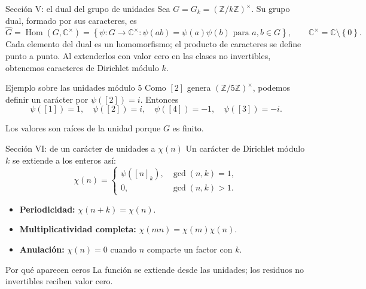 \documentclass[aspectratio=169,11pt]{beamer}
\newcommand{\ZZ}{\mathbb{Z}}
\newcommand{\CC}{\mathbb{C}}
\newcommand{\units}[1]{(\mathbb{Z}/#1\mathbb{Z})^{\times}}
\newcommand{\Set}[1]{\left\{#1\right\}}
\begin{document}
\begin{frame}{Sección V: el dual del grupo de unidades}
    Sea $G=G_k=(\ZZ/k\ZZ)^\times$. Su grupo dual, formado por sus caracteres, es
    \[
      \widehat{G}=\operatorname{Hom}(G,\CC^{\times})
      =\Set{\psi:G\to\CC^{\times}:\psi(ab)=\psi(a)\psi(b)\text{ para }a,b\in G},
      \qquad \CC^{\times}=\CC\setminus\Set{0}.
    \]
    Cada elemento del dual es un homomorfismo; el producto de caracteres se define punto a punto. Al extenderlos con valor cero en las clases no invertibles, obtenemos caracteres de Dirichlet módulo $k$.
    \begin{exampleblock}{Ejemplo sobre las unidades módulo $5$}
        Como $[2]$ genera $\units{5}$, podemos definir un carácter por $\psi([2])=i$. Entonces
        \[
          \psi([1])=1,\quad \psi([2])=i,\quad \psi([4])=-1,\quad \psi([3])=-i.
        \]
    \end{exampleblock}
    \centering\small Los valores son raíces de la unidad porque $G$ es finito.\;\cite[Capítulos 3--5]{Lee2018-aa}
\end{frame}

\begin{frame}{Sección VI: de un carácter de unidades a $\chi(n)$}
    Un carácter de Dirichlet módulo $k$ se extiende a los enteros así:
    \[
      \chi(n)=
      \begin{cases}
        \psi([n]_k),&\gcd(n,k)=1,\\
        0,&\gcd(n,k)>1.
      \end{cases}
    \]
    \begin{itemize}
        \item \textbf{Periodicidad:} $\chi(n+k)=\chi(n)$.
        \item \textbf{Multiplicatividad completa:} $\chi(mn)=\chi(m)\chi(n)$.
        \item \textbf{Anulación:} $\chi(n)=0$ cuando $n$ comparte un factor con $k$.
    \end{itemize}
    \begin{block}{Por qué aparecen ceros}
        La función se extiende desde las unidades; los residuos no invertibles reciben valor cero.
    \end{block}
\end{frame}
\end{document}
